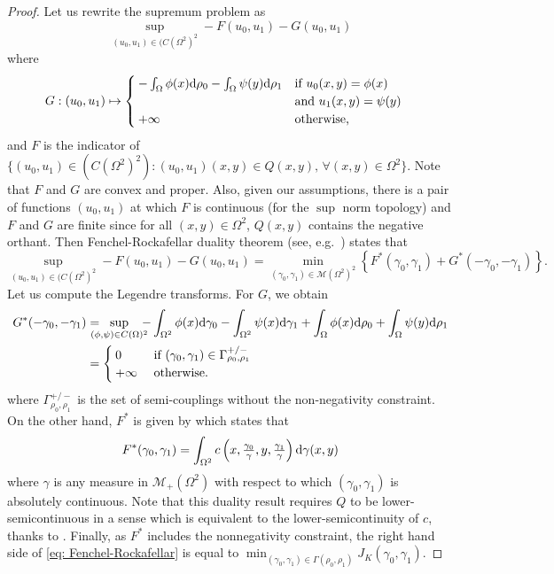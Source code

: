 \begin{proof}
Let us rewrite  the supremum problem as
\[
\sup_{(u_0,u_1) \in (C(\Omega^2)^2} - F(u_0,u_1) - G(u_0,u_1)
\]
where
\begin{align*}
G &: (u_0,u_1) \mapsto 
\begin{cases}
- \int_{\Omega}  \phi(x) \mathrm{d} \rho_0 -  \int_{\Omega} \psi(y) \mathrm{d} \rho_1  & \textnormal{if } u_0(x,y)=\phi(x) \\
		& \textnormal{and } u_1(x,y) = \psi(y) \\
+ \infty &\textnormal{otherwise,}
\end{cases} 
\end{align*}
and $F$ is the indicator of $\{ (u_0,u_1)\in (C(\Omega^2)^2) : (u_0,u_1)(x,y) \in Q(x,y), \, \forall (x,y)\in \Omega^2 \}$.
Note that $F$ and $G$ are convex and proper. Also, given our assumptions, there is a pair of functions $(u_0,u_1)$ at which $F$ is continuous (for the $\sup$ norm topology) and $F$ and $G$ are finite since for all $(x,y)\in \Omega^2$, $Q(x,y)$ contains the negative orthant. Then Fenchel-Rockafellar duality theorem (see, e.g.\ \cite[Theorem 1.9]{cedric2003topics}) states that
 \begin{equation}
 \label{eq: Fenchel-Rockafellar}
 \sup_{(u_0,u_1) \in (C(\Omega^2)^2} \!\!\!\!\!\! - F(u_0,u_1) - G(u_0,u_1) 
 = 
 \!\!\!\!\!\!\min_{(\gamma_0, \gamma_1) \in \mathcal{M}(\Omega^2)^2} \!\!\!\!\! \left\{ F^*(\gamma_0,\gamma_1) + G^*(-\gamma_0,-\gamma_1) \right\} .
 \end{equation}
Let us compute the Legendre transforms. For $G$, we obtain
\begin{align*}
G^*(-\gamma_0,-\gamma_1) 
&= \!\!\!\!\!\! \sup_{(\phi,\psi)\in C(\Omega)^2} \!\!\!\! - \int_{\Omega^2} \phi(x)\d \gamma_0 - \int_{\Omega^2} \psi(x)\d \gamma_1 + \int_{\Omega} \phi(x) \d \rho_0 + \int_{\Omega} \psi(y) \d \rho_1\\
&= 
\begin{cases}
0 & \tn{ if } (\gamma_0, \gamma_1)\in \Gamma^{+/-}_{\rho_0, \rho_1}\\
+ \infty & \tn{ otherwise.}
\end{cases}
\end{align*}
where $\Gamma^{+/-}_{\rho_0, \rho_1} $ is the set of semi-couplings without the non-negativity constraint. On the other hand, $F^*$ is given by \cite[Theorem 6]{rockafellar1971integrals} which states that
\[
F^*(\gamma_0,\gamma_1) = 
\int_{\Omega^2} c\left(x, \textstyle{\frac{ \gamma_0}{ \gamma}},y, \textstyle{\frac{ \gamma_1}{ \gamma}} \right) \mathrm{d}\gamma(x,y) 
\]
where $\gamma$ is any measure in $\mathcal{M}_+(\Omega^2)$ with respect to which $(\gamma_0,\gamma_1)$ is absolutely continuous. Note that this duality result requires $Q$ to be lower-semicontinuous in a sense which is equivalent to the lower-semicontinuity of $c$, thanks to \cite[Lemma A.2]{bouchitte1988integral}. Finally, as $F^*$ includes the nonnegativity constraint, the right hand side of \eqref{eq: Fenchel-Rockafellar} is equal to $\min_{(\gamma_0,\gamma_1)\in \Gamma(\rho_0,\rho_1)} J_K(\gamma_0,\gamma_1)$.
\end{proof}

